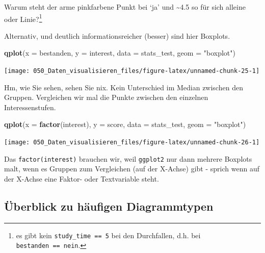 \documentclass[12pt,ngerman,]{book}
\makeatletter
\newenvironment{Shaded}{\begin{snugshade}}{\end{snugshade}}
\newcommand{\KeywordTok}[1]{\textcolor[rgb]{0.13,0.29,0.53}{\textbf{#1}}}
\newcommand{\DataTypeTok}[1]{\textcolor[rgb]{0.13,0.29,0.53}{#1}}
\newcommand{\StringTok}[1]{\textcolor[rgb]{0.31,0.60,0.02}{#1}}
\newcommand{\NormalTok}[1]{#1}
\let\rmarkdownfootnote\footnote%
\def\footnote{\protect\rmarkdownfootnote}
\newenvironment{kframe}{%
\medskip{}
\setlength{\fboxsep}{.8em}
 \def\at@end@of@kframe{}%
 \ifinner\ifhmode%
  \def\at@end@of@kframe{\end{minipage}}%
  \begin{minipage}{\columnwidth}%
 \fi\fi%
 \def\FrameCommand##1{\hskip\@totalleftmargin \hskip-\fboxsep
 \colorbox{shadecolor}{##1}\hskip-\fboxsep
     \hskip-\linewidth \hskip-\@totalleftmargin \hskip\columnwidth}%
 \MakeFramed {\advance\hsize-\width
   \@totalleftmargin\z@ \linewidth\hsize
   \@setminipage}}%
 {\par\unskip\endMakeFramed%
 \at@end@of@kframe}
\renewenvironment{Shaded}{\begin{kframe}}{\end{kframe}}
\theoremstyle{definition}
\theoremstyle{definition}
\theoremstyle{remark}
\makeatother
\begin{document}
Warum steht der arme pinkfarbene Punkt bei `ja' und \textasciitilde{}4.5
so für sich alleine oder Linie?\footnote{es gibt kein
  \texttt{study\_time\ ==\ 5} bei den Durchfallen, d.h. bei
  \texttt{bestanden\ ==\ nein}.}

Alternativ, und deutlich informationsreicher (besser) sind hier
Boxplots.

\begin{Shaded}
\begin{Highlighting}[]
\KeywordTok{qplot}\NormalTok{(}\DataTypeTok{x =}\NormalTok{ bestanden, }
      \DataTypeTok{y =}\NormalTok{ interest,}
      \DataTypeTok{data =}\NormalTok{ stats_test,}
      \DataTypeTok{geom =} \StringTok{"boxplot"}\NormalTok{)}
\end{Highlighting}
\end{Shaded}

\begin{center}\texttt{[image: 050\_Daten\_visualisieren\_files/figure-latex/unnamed-chunk-25-1]} \end{center}

Hm, wie Sie sehen, sehen Sie nix. Kein Unterschied im Median zwischen
den Gruppen. Vergleichen wir mal die Punkte zwischen den einzelnen
Interessenstufen.

\begin{Shaded}
\begin{Highlighting}[]
\KeywordTok{qplot}\NormalTok{(}\DataTypeTok{x =} \KeywordTok{factor}\NormalTok{(interest),}
      \DataTypeTok{y =}\NormalTok{ score,}
      \DataTypeTok{data =}\NormalTok{ stats_test,}
      \DataTypeTok{geom =} \StringTok{"boxplot"}\NormalTok{)}
\end{Highlighting}
\end{Shaded}

\begin{center}\texttt{[image: 050\_Daten\_visualisieren\_files/figure-latex/unnamed-chunk-26-1]} \end{center}

Das \texttt{factor(interest)} brauchen wir, weil \texttt{ggplot2} nur
dann mehrere Boxplots malt, wenn es Gruppen zum Vergleichen (auf der
X-Achse) gibt - sprich wenn auf der X-Achse eine Faktor- oder
Textvariable steht.

\subsection{Überblick zu häufigen
Diagrammtypen}\label{uberblick-zu-haufigen-diagrammtypen}
\end{document}
